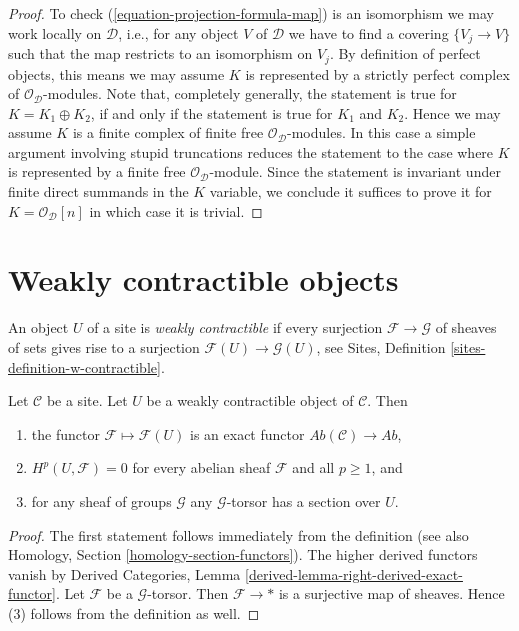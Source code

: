 \begin{proof}
To check (\ref{equation-projection-formula-map}) is an isomorphism
we may work locally on $\mathcal{D}$, i.e.,
for any object $V$ of $\mathcal{D}$ we have to find a covering $\{V_j \to V\}$
such that the map restricts to an isomorphism on $V_j$. By definition
of perfect objects, this means we may assume $K$ is represented by
a strictly perfect complex of $\mathcal{O}_\mathcal{D}$-modules.
Note that, completely generally, the statement is true for
$K = K_1 \oplus K_2$, if and only if the statement is true for
$K_1$ and $K_2$. Hence we may assume $K$ is a finite
complex of finite free $\mathcal{O}_\mathcal{D}$-modules.
In this case a simple argument involving stupid truncations reduces
the statement to the case where $K$ is represented by a finite
free $\mathcal{O}_\mathcal{D}$-module. Since the statement is invariant
under finite direct summands in the $K$ variable, we conclude
it suffices to prove it for $K = \mathcal{O}_\mathcal{D}[n]$
in which case it is trivial.
\end{proof}



\section{Weakly contractible objects}
\label{section-w-contractible}

\noindent
An object $U$ of a site is {\it weakly contractible} if every surjection
$\mathcal{F} \to \mathcal{G}$ of sheaves of sets gives rise to a surjection
$\mathcal{F}(U) \to \mathcal{G}(U)$, see
Sites, Definition \ref{sites-definition-w-contractible}.

\begin{lemma}
\label{lemma-w-contractible}
Let $\mathcal{C}$ be a site. Let $U$ be a weakly contractible
object of $\mathcal{C}$. Then
\begin{enumerate}
\item the functor $\mathcal{F} \mapsto \mathcal{F}(U)$ is an exact
functor $\textit{Ab}(\mathcal{C}) \to \textit{Ab}$,
\item $H^p(U, \mathcal{F}) = 0$
for every abelian sheaf $\mathcal{F}$ and all $p \geq 1$, and
\item for any sheaf of groups $\mathcal{G}$ any $\mathcal{G}$-torsor
has a section over $U$.
\end{enumerate}
\end{lemma}

\begin{proof}
The first statement follows immediately from the definition
(see also Homology, Section \ref{homology-section-functors}).
The higher derived functors vanish by
Derived Categories, Lemma \ref{derived-lemma-right-derived-exact-functor}.
Let $\mathcal{F}$ be a $\mathcal{G}$-torsor. Then $\mathcal{F} \to *$
is a surjective map of sheaves. Hence (3) follows from the
definition as well.
\end{proof}

